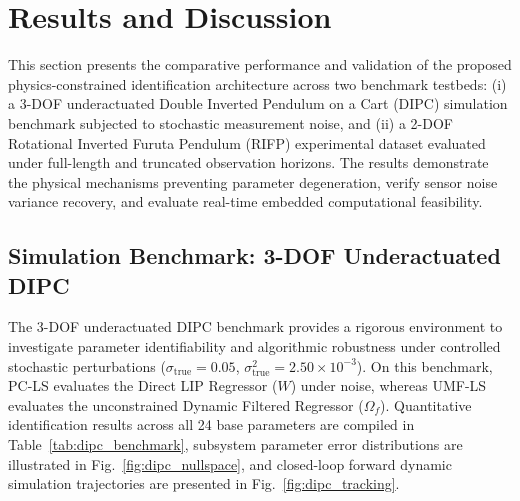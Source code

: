 \documentclass[lettersize,journal]{IEEEtran}
\begin{document}
\section{Results and Discussion}
\label{sec:results}

This section presents the comparative performance and validation of the proposed physics-constrained identification architecture across two benchmark testbeds: (i) a 3-DOF underactuated Double Inverted Pendulum on a Cart (DIPC) simulation benchmark subjected to stochastic measurement noise, and (ii) a 2-DOF Rotational Inverted Furuta Pendulum (RIFP) experimental dataset \cite{AguilarSierra2014} evaluated under full-length and truncated observation horizons. The results demonstrate the physical mechanisms preventing parameter degeneration, verify sensor noise variance recovery, and evaluate real-time embedded computational feasibility.

\subsection{Simulation Benchmark: 3-DOF Underactuated DIPC}
\label{sec:results_dipc}
The 3-DOF underactuated DIPC benchmark provides a rigorous environment to investigate parameter identifiability and algorithmic robustness under controlled stochastic perturbations ($\sigma_{\text{true}} = 0.05$, $\sigma^2_{\text{true}} = 2.50 \times 10^{-3}$). On this benchmark, PC-LS evaluates the Direct LIP Regressor ($W$) under noise, whereas UMF-LS evaluates the unconstrained Dynamic Filtered Regressor ($\Omega_f$). Quantitative identification results across all 24 base parameters are compiled in Table~\ref{tab:dipc_benchmark}, subsystem parameter error distributions are illustrated in Fig.~\ref{fig:dipc_nullspace}, and closed-loop forward dynamic simulation trajectories are presented in Fig.~\ref{fig:dipc_tracking}.
\end{document}
